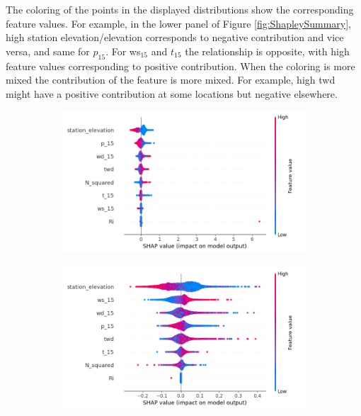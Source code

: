 The coloring of the points in the displayed distributions show the corresponding feature values. For example, in the lower panel of Figure \ref{fig:ShapleySummary}, high station elevation/elevation corresponds to negative contribution and vice versa, and same for $p_{15}$. For ws$_{15}$ and $t_{15}$ the relationship is opposite, with high feature values corresponding to positive contribution. When the coloring is more mixed the contribution of the feature is more mixed. For example, high twd might have a positive contribution at some locations but negative elsewhere.

\begin{figure}
  \centering
  \begin{subfigure}{0.85\textwidth}
    \includegraphics[width=\textwidth]{Figures/shap_plots/summary_plot.png}
    \label{fig:ShapleySummarySmallerSet}
  \end{subfigure}
  \vspace{0.5cm}
  \begin{subfigure}{0.85\textwidth}
    \includegraphics[width=\textwidth]{Figures/shap_plots/summary_plot_190924_.png}

\end{subfigure}
\end{figure}
